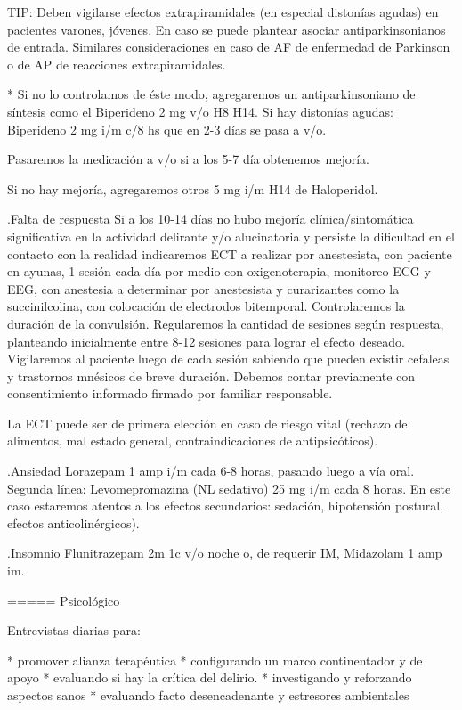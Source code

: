 TIP: Deben vigilarse efectos extrapiramidales (en especial distonías agudas) en pacientes varones, jóvenes. En caso se puede plantear asociar antiparkinsonianos de entrada. Similares consideraciones en caso de AF de enfermedad de Parkinson o de AP de reacciones extrapiramidales.

* Si no lo controlamos de éste modo, agregaremos un antiparkinsoniano de síntesis como el Biperideno 2 mg v/o H8 H14. Si hay distonías agudas: Biperideno 2 mg i/m c/8 hs que en 2-3 días se pasa a v/o.

Pasaremos la medicación a v/o si a los 5-7 día obtenemos mejoría.

Si no hay mejoría, agregaremos otros 5 mg i/m H14 de Haloperidol.

.Falta de respuesta
Si a los 10-14 días no hubo mejoría clínica/sintomática significativa en la actividad delirante y/o alucinatoria y persiste la dificultad en el contacto con la realidad indicaremos ECT a realizar por anestesista, con paciente en ayunas, 1 sesión cada día por medio con oxigenoterapia, monitoreo ECG y EEG, con anestesia a determinar por anestesista y curarizantes como la succinilcolina, con colocación de electrodos bitemporal. Controlaremos la duración de la convulsión. Regularemos la cantidad de sesiones según respuesta, planteando inicialmente entre 8-12 sesiones para lograr el efecto deseado. Vigilaremos al paciente luego de cada sesión sabiendo que pueden existir cefaleas y trastornos mnésicos de breve duración. Debemos contar previamente con consentimiento informado firmado por familiar responsable.

La ECT puede ser de primera elección en caso de riesgo vital (rechazo de alimentos, mal estado general, contraindicaciones de antipsicóticos).

.Ansiedad
Lorazepam 1 amp i/m cada 6-8 horas, pasando luego a vía oral. Segunda línea: Levomepromazina (NL sedativo) 25 mg i/m cada 8 horas. En este caso estaremos atentos a los efectos secundarios: sedación, hipotensión postural, efectos anticolinérgicos).

.Insomnio
Flunitrazepam 2m 1c v/o noche o, de requerir IM, Midazolam 1 amp im.


===== Psicológico

Entrevistas diarias para:

* promover alianza terapéutica
* configurando un marco continentador y de apoyo
* evaluando si hay la crítica del delirio.
* investigando y reforzando aspectos sanos
* evaluando facto desencadenante y estresores ambientales

